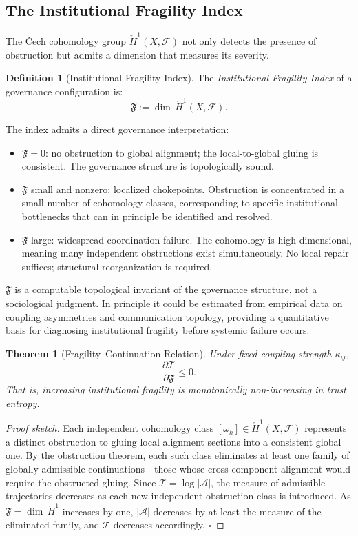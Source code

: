 \documentclass[11pt,a4paper]{article}
\theoremstyle{definition}
\newtheorem{definition}{Definition}
\theoremstyle{plain}
\newtheorem{theorem}{Theorem}
\begin{document}
\begin{mdframed}[style=appendixbox]
\subsection{The Institutional Fragility Index}

The \v{C}ech cohomology group $\check{H}^1(X, \mathcal{F})$ not only detects the presence of obstruction but admits a dimension that measures its severity.

\begin{definition}[Institutional Fragility Index]
The \emph{Institutional Fragility Index} of a governance configuration is:
\[
\mathfrak{F} := \dim\,\check{H}^1(X, \mathcal{F}).
\]
\end{definition}

The index admits a direct governance interpretation:
\begin{itemize}
\item $\mathfrak{F} = 0$: no obstruction to global alignment; the local-to-global gluing is consistent. The governance structure is topologically sound.
\item $\mathfrak{F}$ small and nonzero: localized chokepoints. Obstruction is concentrated in a small number of cohomology classes, corresponding to specific institutional bottlenecks that can in principle be identified and resolved.
\item $\mathfrak{F}$ large: widespread coordination failure. The cohomology is high-dimensional, meaning many independent obstructions exist simultaneously. No local repair suffices; structural reorganization is required.
\end{itemize}

$\mathfrak{F}$ is a computable topological invariant of the governance structure, not a sociological judgment. In principle it could be estimated from empirical data on coupling asymmetries and communication topology, providing a quantitative basis for diagnosing institutional fragility before systemic failure occurs.

\begin{theorem}[Fragility--Continuation Relation]
Under fixed coupling strength $\kappa_{ij}$,
\[
\frac{\partial \mathcal{T}}{\partial \mathfrak{F}} \leq 0.
\]
That is, increasing institutional fragility is monotonically non-increasing in trust entropy.
\end{theorem}

\begin{proof}[Proof sketch]
Each independent cohomology class $[\omega_k] \in \check{H}^1(X, \mathcal{F})$ represents a distinct obstruction to gluing local alignment sections into a consistent global one. By the obstruction theorem, each such class eliminates at least one family of globally admissible continuations---those whose cross-component alignment would require the obstructed gluing. Since $\mathcal{T} = \log|\mathcal{A}|$, the measure of admissible trajectories decreases as each new independent obstruction class is introduced. As $\mathfrak{F} = \dim\,\check{H}^1$ increases by one, $|\mathcal{A}|$ decreases by at least the measure of the eliminated family, and $\mathcal{T}$ decreases accordingly. $\square$
\end{proof}


\end{mdframed}
\end{document}
